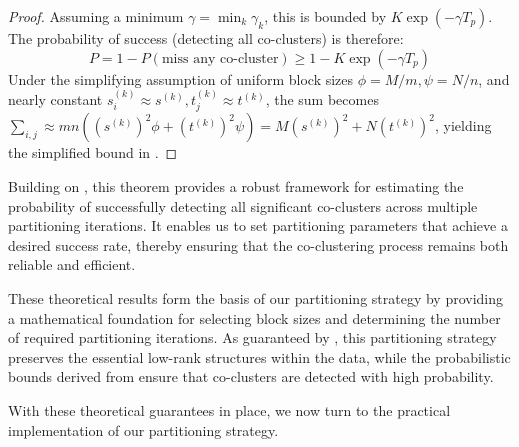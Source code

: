 \documentclass[journal]{IEEEtran}
\theoremstyle{definition}
\theoremstyle{remark} %
\begin{document}
{\begin{proof}
    Assuming a minimum $\gamma = \min_k \gamma_k$, this is bounded by $K \exp(-\gamma T_p)$. The probability of success (detecting all co-clusters) is therefore:
    \begin{equation}
        P = 1 - P(\text{miss any co-cluster}) \ge 1 - K \exp(-\gamma T_p)
    \end{equation}
    Under the simplifying assumption of uniform block sizes $\phi=M/m, \psi=N/n$, and nearly constant $s_i^{(k)} \approx s^{(k)}, t_j^{(k)} \approx t^{(k)}$, the sum becomes $\sum_{i,j} \approx mn \left( (s^{(k)})^2 \phi + (t^{(k)})^2 \psi \right) = M (s^{(k)})^2 + N (t^{(k)})^2$, yielding the simplified bound in .
\end{proof}
}

Building on , this theorem provides a robust framework for estimating the probability of successfully detecting all significant co-clusters across multiple partitioning iterations. It enables us to set partitioning parameters that achieve a desired success rate, thereby ensuring that the co-clustering process remains both reliable and efficient.

These theoretical results form the basis of our partitioning strategy by providing a mathematical foundation for selecting block sizes and determining the number of required partitioning iterations. As guaranteed by , this partitioning strategy preserves the essential low-rank structures within the data, while the probabilistic bounds derived from  ensure that co-clusters are detected with high probability.

With these theoretical guarantees in place, we now turn to the practical implementation of our partitioning strategy.
\end{document}

